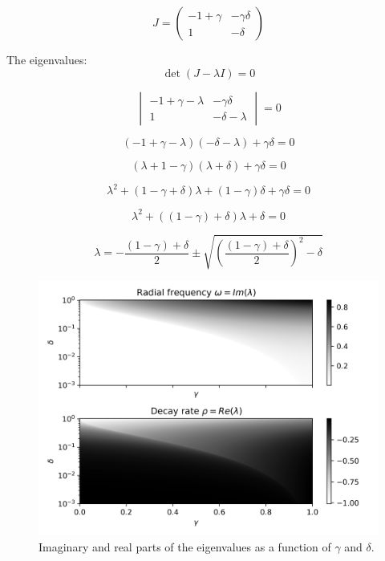 \documentclass[11pt,a4paper,fleqn]{scrartcl}
\begin{document}
\[
J =
\begin{pmatrix}
-1 + \gamma & -\gamma \delta \\
1 & -\delta
\end{pmatrix}
\]

The eigenvalues:
\[
\det(J - \lambda I) = 0
\]

\[
\begin{vmatrix}
-1 + \gamma - \lambda & -\gamma \delta \\
1 & -\delta - \lambda
\end{vmatrix}
= 0
\]

\[
(-1 + \gamma - \lambda)(-\delta - \lambda) + \gamma \delta = 0
\]

\[
(\lambda + 1 - \gamma)(\lambda + \delta) + \gamma \delta = 0
\]

\[
\lambda^2 + (1 - \gamma + \delta)\lambda + (1 - \gamma)\delta + \gamma \delta = 0
\]

\[
\lambda^2 + \left( (1 - \gamma) + \delta \right)\lambda + \delta = 0
\]

\[
\lambda = -\frac{(1 - \gamma) + \delta}{2} 
\pm 
\sqrt{\left( \frac{(1 - \gamma) + \delta}{2} \right)^2 - \delta}
\]

\begin{figure}[H]
    \centering
    \includegraphics[width=\linewidth]{SingleSpecies/RadFreq.png}
    \caption{Imaginary and real parts of the eigenvalues as a function of $\gamma$ and $\delta$.}
\label{figRealandImaginaryPart}
\end{figure}
\end{document}
